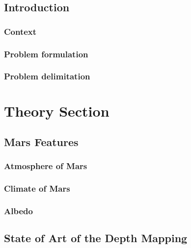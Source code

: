 \documentclass[12pt,a4paper,fleqn, onesside]{report}
\begin{document}
\pagebreak
{}
\setcounter{page}{1}
\setcounter{tocdepth}{4}
\setcounter{secnumdepth}{4} 
\def\chaptername{Part}

\tableofcontents
\newpage
{}

\section*{Introduction}
\subsection*{Context}

\subsection*{Problem formulation}

\subsection*{Problem delimitation}


\chapter{Theory Section}
\section{Mars Features}

\subsection{Atmosphere of Mars}

\subsection{Climate of Mars}

\subsection{Albedo}

\section{State of Art of the Depth Mapping}


\end{document}
